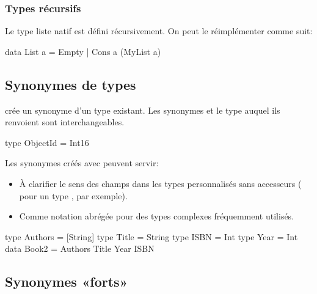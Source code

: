 \subsubsection{Types récursifs}

Le type liste natif est défini récursivement. On peut le réimplémenter comme suit:

\begin{haskellcode}
data List a = Empty | Cons a (MyList a)
\end{haskellcode}

\subsection{Synonymes de types}

 crée un synonyme d'un type existant. Les synonymes et le type auquel ils
renvoient sont interchangeables.

\begin{haskellcode}
type ObjectId = Int16
\end{haskellcode}

Les synonymes créés avec  peuvent servir:

\begin{itemize}
    \item À clarifier le sens des champs dans les types personnalisés sans accesseurs ( pour un type , par exemple).
    \item Comme notation abrégée pour des types complexes fréquemment utilisés.
\end{itemize}

\begin{haskellcode}
type Authors = [String]
type Title = String
type ISBN = Int
type Year = Int
data Book2 = Authors Title Year ISBN
\end{haskellcode}

\subsection{Synonymes «forts»}


